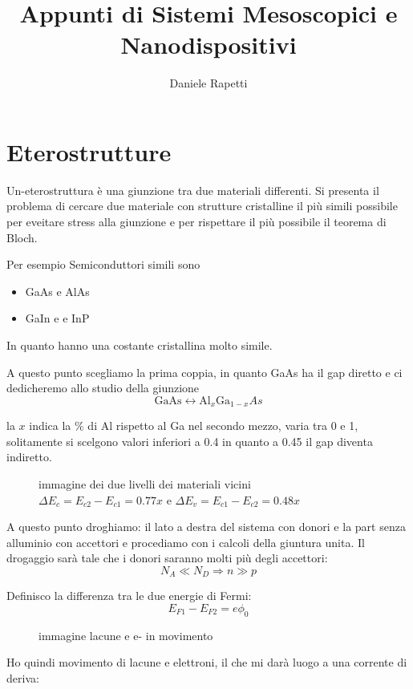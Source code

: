 \documentclass[]{article}
\title{Appunti di Sistemi Mesoscopici e Nanodispositivi}
\author{Daniele Rapetti}
\date{}
\numberwithin{equation}{subsection}
\begin{document}
	\maketitle
	\section{Eterostrutture}
	Un-eterostruttura \`e una giunzione tra due materiali differenti. Si presenta il problema di cercare due materiale con strutture cristalline il pi\`u simili possibile per eveitare stress alla giunzione e per rispettare il pi\`u possibile il teorema di Bloch.
	
	Per esempio Semiconduttori simili sono
	\begin{itemize}
		\item GaAs e AlAs
		\item GaIn e e InP
	\end{itemize}
	In quanto hanno una costante cristallina molto simile.
	
	A questo punto scegliamo la prima coppia, in quanto GaAs ha il gap diretto e ci dedicheremo allo studio della giunzione 
	\begin{equation*}
	\text{GaAs}\leftrightarrow\text{Al}_x\text{Ga}_{1-x}As
	\end{equation*}
	
	la $x$ indica la $\%$ di Al rispetto al Ga nel secondo mezzo, varia tra 0 e 1, solitamente si scelgono valori inferiori a 0.4 in quanto a 0.45 il gap diventa indiretto.
	
	\begin{figure}[h]
		\caption{}
		immagine dei due livelli dei materiali vicini $\Delta E_c = E_{c2}-E_{c1} = 0.77 x$ e $\Delta E_v = E_{c1}-E_{c2} = 0.48 x$
	\end{figure}
	
	A questo punto droghiamo: il lato a destra del sistema con donori e la part senza alluminio con accettori e procediamo con i calcoli della giuntura unita. Il drogaggio sar\`a tale che i donori saranno molti pi\`u degli accettori:
	\begin{equation*}
	N_A\ll N_D  \Rightarrow n \gg p
	\end{equation*}

	Definisco la differenza tra le due energie di Fermi:
	\begin{equation}
	E_{F1} - E_{F2} = e\phi_0
	\end{equation}
	
	\begin{figure}
		immagine lacune e e- in movimento
	\end{figure}
	Ho quindi movimento di lacune e elettroni, il che mi dar\`a luogo  a una corrente di deriva:
	
\end{document}
